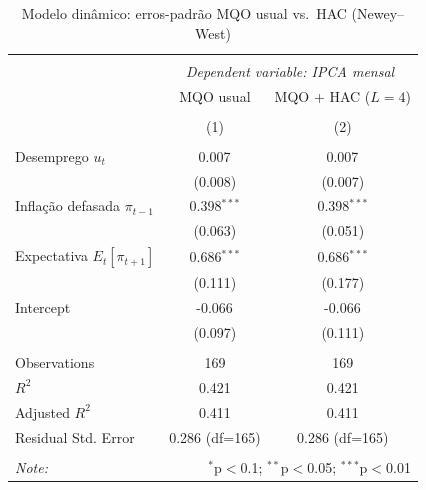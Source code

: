 \begin{table}[!htbp] \centering
  \caption{Modelo dinâmico: erros-padrão MQO usual vs.\ HAC (Newey--West)}
\begin{tabular}{@{\extracolsep{5pt}}lcc}
\\[-1.8ex]\hline
\hline \\[-1.8ex]
& \multicolumn{2}{c}{\textit{Dependent variable: IPCA mensal}} \
\cr \cline{2-3}
\\[-1.8ex] & \multicolumn{1}{c}{MQO usual} & \multicolumn{1}{c}{MQO + HAC ($L=4$)}  \\
\\[-1.8ex] & (1) & (2) \\
\hline \\[-1.8ex]
 Desemprego $u_t$ & 0.007$^{}$ & 0.007$^{}$ \\
& (0.008) & (0.007) \\
 Inflação defasada $\pi_{t-1}$ & 0.398$^{***}$ & 0.398$^{***}$ \\
& (0.063) & (0.051) \\
 Expectativa $E_t[\pi_{t+1}]$ & 0.686$^{***}$ & 0.686$^{***}$ \\
& (0.111) & (0.177) \\
 Intercept & -0.066$^{}$ & -0.066$^{}$ \\
& (0.097) & (0.111) \\
\hline \\[-1.8ex]
 Observations & 169 & 169 \\
 $R^2$ & 0.421 & 0.421 \\
 Adjusted $R^2$ & 0.411 & 0.411 \\
 Residual Std. Error & 0.286 (df=165) & 0.286 (df=165) \\
\hline
\hline \\[-1.8ex]
\textit{Note:} & \multicolumn{2}{r}{$^{*}$p$<$0.1; $^{**}$p$<$0.05; $^{***}$p$<$0.01} \\
\end{tabular}
\end{table}